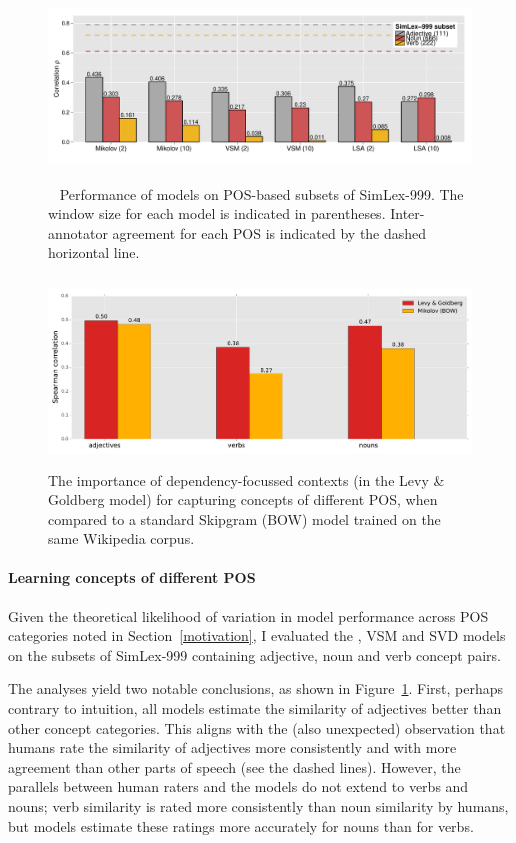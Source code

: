 \begin{figure}[]  \includegraphics[width = \textwidth,height=5cm]{Chapter_2/Figure_5_CL}  \caption{~\label{fig11} Performance of models on POS-based subsets of SimLex-999. The window size for each model is indicated in parentheses. Inter-annotator agreement for each POS is indicated by the dashed horizontal line.}\end{figure}

\begin{figure}[]  \includegraphics[width = \textwidth,height=5cm]{Chapter_2/New_Figure_2_CL}  \caption{\label{fig12} The importance of dependency-focussed contexts (in the Levy \& Goldberg model) for capturing concepts of different POS, when compared to a standard Skipgram (BOW) model trained on the same Wikipedia corpus.}\end{figure}



\paragraph{\bf Learning concepts of different POS}
\label{begin}

Given the theoretical likelihood of variation in model performance across POS categories noted in Section~\ref{motivation}, I evaluated the \cite{mikolov2013efficient}, VSM and SVD models on the subsets of SimLex-999 containing adjective, noun and verb concept pairs. 

The analyses yield two notable conclusions, as shown in Figure~\ref{fig11}. First, perhaps contrary to intuition, all models estimate the similarity of adjectives better than other concept categories. This aligns with the (also unexpected) observation that humans rate the similarity of adjectives more consistently and with more agreement than other parts of speech (see the dashed lines). However, the parallels between human raters and the models do not extend to verbs and nouns; verb similarity is rated more consistently than noun similarity by humans, but models estimate these ratings more accurately for nouns than for verbs. 

